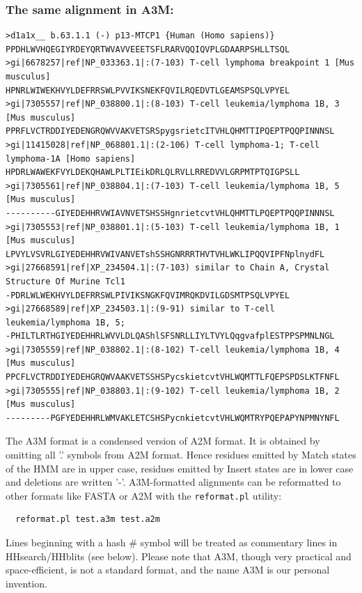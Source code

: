 \documentclass[11pt,a4paper]{article}
\begin{document}
\subsubsection*{The same alignment in A3M:}

\scriptsize\begin{verbatim}
>d1a1x__ b.63.1.1 (-) p13-MTCP1 {Human (Homo sapiens)}
PPDHLWVHQEGIYRDEYQRTWVAVVEEETSFLRARVQQIQVPLGDAARPSHLLTSQL
>gi|6678257|ref|NP_033363.1|:(7-103) T-cell lymphoma breakpoint 1 [Mus musculus]
HPNRLWIWEKHVYLDEFRRSWLPVVIKSNEKFQVILRQEDVTLGEAMSPSQLVPYEL
>gi|7305557|ref|NP_038800.1|:(8-103) T-cell leukemia/lymphoma 1B, 3 [Mus musculus]
PPRFLVCTRDDIYEDENGRQWVVAKVETSRSpygsrietcITVHLQHMTTIPQEPTPQQPINNNSL
>gi|11415028|ref|NP_068801.1|:(2-106) T-cell lymphoma-1; T-cell lymphoma-1A [Homo sapiens]
HPDRLWAWEKFVYLDEKQHAWLPLTIEikDRLQLRVLLRREDVVLGRPMTPTQIGPSLL
>gi|7305561|ref|NP_038804.1|:(7-103) T-cell leukemia/lymphoma 1B, 5 [Mus musculus]
----------GIYEDEHHRVWIAVNVETSHSSHgnrietcvtVHLQHMTTLPQEPTPQQPINNNSL
>gi|7305553|ref|NP_038801.1|:(5-103) T-cell leukemia/lymphoma 1B, 1 [Mus musculus]
LPVYLVSVRLGIYEDEHHRVWIVANVETshSSHGNRRRTHVTVHLWKLIPQQVIPFNplnydFL
>gi|27668591|ref|XP_234504.1|:(7-103) similar to Chain A, Crystal Structure Of Murine Tcl1
-PDRLWLWEKHVYLDEFRRSWLPIVIKSNGKFQVIMRQKDVILGDSMTPSQLVPYEL
>gi|27668589|ref|XP_234503.1|:(9-91) similar to T-cell leukemia/lymphoma 1B, 5;
-PHILTLRTHGIYEDEHHRLWVVLDLQAShlSFSNRLLIYLTVYLQqgvafplESTPPSPMNLNGL
>gi|7305559|ref|NP_038802.1|:(8-102) T-cell leukemia/lymphoma 1B, 4 [Mus musculus] 
PPCFLVCTRDDIYEDEHGRQWVAAKVETSSHSPycskietcvtVHLWQMTTLFQEPSPDSLKTFNFL
>gi|7305555|ref|NP_038803.1|:(9-102) T-cell leukemia/lymphoma 1B, 2 [Mus musculus]
---------PGFYEDEHHRLWMVAKLETCSHSPycnkietcvtVHLWQMTRYPQEPAPYNPMNYNFL
\end{verbatim}\normalsize

The A3M format is a condensed version of A2M format. It is obtained by omitting all '.' 
symbols from A2M format. Hence residues emitted by Match states of the HMM are in upper 
case, residues emitted by Insert states are in lower case and deletions are written '-'.
A3M-formatted alignments can be reformatted to other formats like FASTA or A2M with 
the \verb`reformat.pl` utility:
\begin{verbatim}
  reformat.pl test.a3m test.a2m
\end{verbatim}
Lines beginning with a hash \# symbol will be treated as commentary lines in HHsearch/HHblits
(see below). Please note that A3M, though very practical and space-efficient, 
is not a standard format, and the name A3M is our personal invention.
\end{document}
